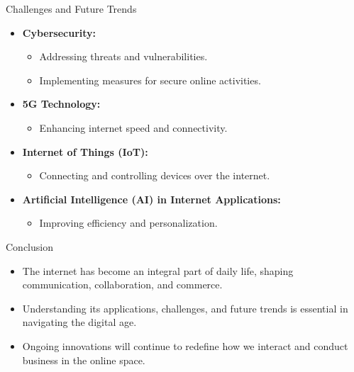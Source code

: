 \begin{frame}{Challenges and Future Trends}
  \begin{itemize}
    \item \textbf{Cybersecurity:}
      \begin{itemize}
        \item Addressing threats and vulnerabilities.
        \item Implementing measures for secure online activities.
      \end{itemize}
    \item \textbf{5G Technology:}
      \begin{itemize}
        \item Enhancing internet speed and connectivity.
      \end{itemize}
    \item \textbf{Internet of Things (IoT):}
      \begin{itemize}
        \item Connecting and controlling devices over the internet.
      \end{itemize}
    \item \textbf{Artificial Intelligence (AI) in Internet Applications:}
      \begin{itemize}
        \item Improving efficiency and personalization.
      \end{itemize}
  \end{itemize}
\end{frame}

\begin{frame}{Conclusion}
  \begin{itemize}
    \item The internet has become an integral part of daily life, shaping communication, collaboration, and commerce.
    \item Understanding its applications, challenges, and future trends is essential in navigating the digital age.
    \item Ongoing innovations will continue to redefine how we interact and conduct business in the online space.
  \end{itemize}
\end{frame}

